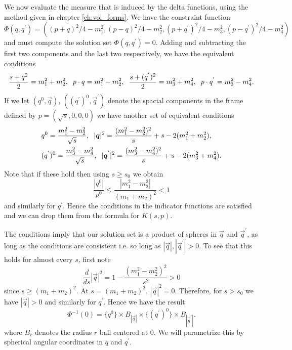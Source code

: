 We now evaluate the measure that is induced by the delta functions, using the method given in chapter \ref{ch:vol_forms}.  We have the constraint function
\begin{equation}
\Phi(q,q^{'})=((p+q)^2/4-m_1^2,(p-q)^2/4-m_2^2,(p+q^{'})^2/4-m_3^2,(p-q^{'})^2/4-m_4^2)
\end{equation}
and must compute the solution set $\Phi(q,q^{'})=0$. Adding and subtracting the first two components and the last two respectively, we have the equivalent conditions
\begin{align}
\frac{s+q^2}{2}=m_1^2+m_2^2,\hspace{2mm} p\cdot q=m_1^2-m_2^2, \hspace{2mm}\frac{s+(q^{'})^2}{2}=m_3^2+m_4^2,\hspace{2mm} p\cdot q^{'}=m_3^2-m_4^2.
\end{align}
If we let $(q^0,\vec{q})$, $((q^{'})^0,\vec{q}^{'})$ denote the spacial components in the frame defined by $p=(\sqrt{s},0,0,0)$ we have another set of equivalent conditions
\begin{align}\label{coord_conditions}
&q^{0}=\frac{m_1^2-m_2^2}{\sqrt{s}},\hspace{2mm} |\vec{q}|^2=\frac{(m_1^2-m_2^2)^2}{s}+s-2(m_1^2+m_2^2),\\
&(q^{'})^{0}=\frac{m_3^2-m_4^2}{\sqrt{s}}, \hspace{2mm} |\vec{q}^{'}|^2=\frac{(m_3^2-m_4^2)^2}{s}+s-2(m_3^2+m_4^2).
\end{align}
Note that if these hold then using $s\geq s_0$ we obtain
\begin{equation}
\frac{|q^0|}{p^0}\leq \frac{|m_1^2-m_2^2|}{(m_1+m_2)^2}<1
\end{equation}
and similarly for $q^{'}$.  Hence the conditions in the indicator functions are satisfied and we can drop them from the formula for $K(s,p)$.

The conditions  imply that our solution set is a product of spheres in $\vec{q}$ and $\vec{q}^{'}$, as long as the conditions are consistent i.e. so long as $|\vec{q}|,|\vec{q}^{'}|>0$. To see that this holds for almost every $s$, first note
\begin{equation}
\frac{d}{ds}|\vec{q}|^2=1-\frac{(m_1^2-m_2^2)^2}{s^2}>0
\end{equation}
since $s\geq (m_1+m_2)^2$.  At $s=(m_1+m_2)^2$, $|\vec{q}|^2=0$.  Therefore, for $s>s_0$ we have $|\vec{q}|>0$ and similarly for $q^{'}$.  Hence we have the result
\begin{equation}
\Phi^{-1}(0)=\{q^{0}\}\times B_{|\vec{q}|}\times \{(q^{'})^{0}\}\times B_{|\vec{q}^{'}|}.
\end{equation}
where $B_r$ denotes the radius $r$ ball centered at $0$.  We will parametrize this by spherical angular coordinates in $q$ and $q^{'}$. 

